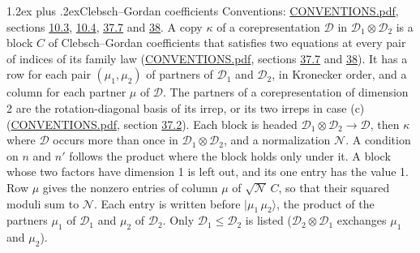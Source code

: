 \documentclass[10pt,a4paper]{article}
\makeatletter
\renewcommand\section{\@startsection{section}{1}{\z@}{-3ex plus -1ex minus -.2ex}%
  {1.2ex plus .2ex}{\normalfont\large\sffamily\bfseries\color{parttitle}}}
\numberwithin{equation}{section}
\newcommand{\irrprod}{\otimes}
\newcommand{\mult}{\kappa}
\newcommand{\intx}{\mu}
\newcommand{\cgnorm}{\mathcal{N}}
\newcommand{\prodket}[2]{\lvert {#1}\,{#2}\rangle}
\makeatother
\begin{document}
\section{Clebsch--Gordan coefficients}\label{s:clebsch_gordan}
Conventions: \href{../../CONVENTIONS.pdf}{CONVENTIONS.pdf}, sections \href{../../../rotation/CONVENTIONS.pdf\#conv.10.3}{10.3}, \href{../../../rotation/CONVENTIONS.pdf\#conv.10.4}{10.4}, \href{../../CONVENTIONS.pdf\#conv.37.7}{37.7} and \href{../../CONVENTIONS.pdf\#conv.38}{38}.
\leavevmode\label{n:matrix.corep.factors}\label{n:index.copy}\label{n:matrix.cg.stored}A copy $\mult$ of a corepresentation $\mathcal{D}$ in $\mathcal{D}_1\irrprod\mathcal{D}_2$ is a block $C$ of Clebsch--Gordan coefficients that satisfies two equations at every pair of indices of its family law (\href{../../CONVENTIONS.pdf}{CONVENTIONS.pdf}, sections \href{../../CONVENTIONS.pdf\#conv.37.7}{37.7} and \href{../../CONVENTIONS.pdf\#conv.38}{38}). \label{n:index.cg}It has a row for each pair $(\intx_1, \intx_2)$ of partners of $\mathcal{D}_1$ and $\mathcal{D}_2$, in Kronecker order, and a column for each partner $\intx$ of $\mathcal{D}$.
The partners of a corepresentation of dimension 2 are the rotation-diagonal basis of its irrep, or its two irreps in case (c) (\href{../../CONVENTIONS.pdf}{CONVENTIONS.pdf}, section \href{../../CONVENTIONS.pdf\#conv.37.2}{37.2}).
Each block is headed $\mathcal{D}_1\irrprod\mathcal{D}_2\to\mathcal{D}$, then $\mult$ where $\mathcal{D}$ occurs more than once in $\mathcal{D}_1\irrprod\mathcal{D}_2$, and a normalization $\cgnorm$. A condition on $n$ and $n'$ follows the product where the block holds only under it. A block whose two factors have dimension 1 is left out, and its one entry has the value 1. Row $\intx$ gives the nonzero entries of column $\intx$ of $\sqrt{\cgnorm}\,C$, so that their squared moduli sum to $\cgnorm$. \label{n:vector.ket.product}Each entry is written before $\prodket{\intx_1}{\intx_2}$, the product of the partners $\intx_1$ of $\mathcal{D}_1$ and $\intx_2$ of $\mathcal{D}_2$. Only $\mathcal{D}_1 \le \mathcal{D}_2$ is listed ($\mathcal{D}_2\irrprod\mathcal{D}_1$ exchanges $\intx_1$ and $\intx_2$).
\end{document}
